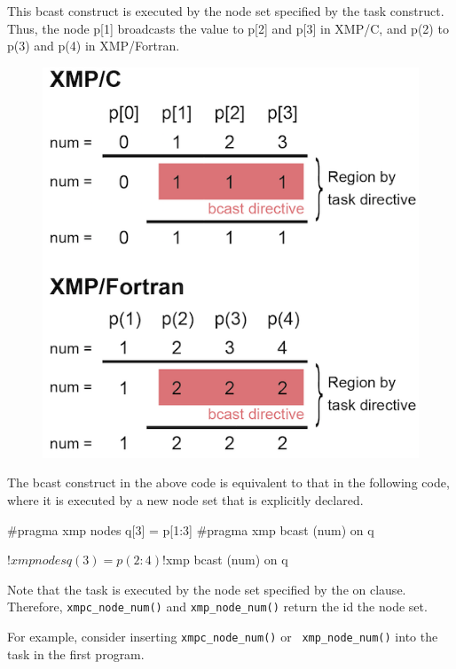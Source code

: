 This bcast construct is executed by the node set specified by the task
construct. Thus, the node p[1] broadcasts the value to p[2] and p[3] in
XMP/C, and p(2) to p(3) and p(4) in XMP/Fortran.

\begin{figure}
  \centering
  \includegraphics{figs/task.png}
\end{figure}

The bcast construct in the above code is equivalent to that in the
following code, where it is executed by a new node set that is
explicitly declared.

\begin{XCexample}
#pragma xmp nodes q[3] = p[1:3]
#pragma xmp bcast (num) on q
\end{XCexample}

\begin{XFexample}
!$xmp nodes q(3) = p(2:4)
!$xmp bcast (num) on q
\end{XFexample}

Note that the task is executed by the node set specified by the on
clause. Therefore, {\tt xmpc\_node\_num()} and {\tt xmp\_node\_num()}
return the id the node set.

For example, consider inserting {\tt xmpc\_node\_num()} or {\tt
xmp\_node\_num()} into the task in the first program.

